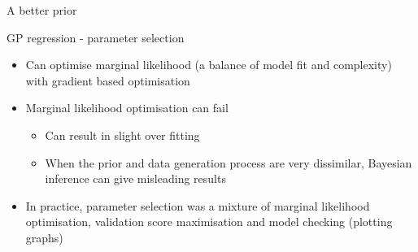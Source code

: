 \begin{frame}{A better prior}
  \begin{centering}
    
  \end{centering}
\end{frame}

\begin{frame}{GP regression - parameter selection}
  \begin{itemize}
    \item Can optimise marginal likelihood (a balance of model fit and complexity) with gradient based optimisation
    \vspace{\baselineskip}
    \item Marginal likelihood optimisation can fail
    \begin{itemize}
      \item Can result in slight over fitting
      \item When the prior and data generation process are very dissimilar, Bayesian inference can give misleading results
    \end{itemize}
    \vspace{\baselineskip}
    \item In practice, parameter selection was a mixture of marginal likelihood optimisation, validation score maximisation and model checking (plotting graphs)
  \end{itemize}
\end{frame}

